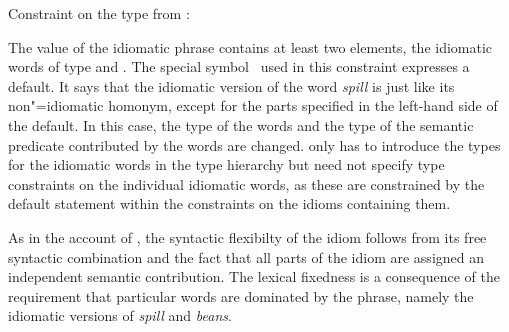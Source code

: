 \documentclass[output=paper
	        ,collection
	        ,collectionchapter
 	        ,biblatex
                ,babelshorthands
                ,newtxmath
                ,draftmode
                ,colorlinks, citecolor=brown
]{langscibook}
\begin{document}
\vbox{
\ea Constraint on the type  from \citet[185]{Riehemann2001a}:\label{sr-spillbeans}\\
\z 
}

The  value of the idiomatic phrase contains at least two elements, the idiomatic words of type  and . 
The special symbol \srdefault\ used in this constraint expresses a default. It says that the idiomatic version of the word \emph{spill} is just like its non"=idiomatic homonym, except for the parts specified in the left-hand side of the default. 
In this case, the type of the words and the type of the semantic predicate contributed by the words are changed. 
\citet{Riehemann2001a} only has to introduce the types for the idiomatic words in the type hierarchy but need not specify type constraints on the individual idiomatic words, as these are constrained by the default statement within the constraints on the idioms containing them.


As in the account of \citet{KE94a}, the syntactic flexibilty of the idiom follows from its free syntactic combination and the fact that all parts of the idiom are assigned an independent semantic contribution. The lexical fixedness is a consequence of the requirement that particular words are dominated by the phrase, namely the idiomatic versions of \emph{spill} and \emph{beans}.
\end{document}
